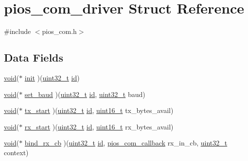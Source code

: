 \hypertarget{structpios__com__driver}{\section{pios\-\_\-com\-\_\-driver Struct Reference}
\label{structpios__com__driver}
}


{\ttfamily \#include $<$pios\-\_\-com.\-h$>$}

\subsection*{Data Fields}
\begin{DoxyCompactItemize}
\item 
\hyperlink{group___n_a_m_e_ga18028b8badbf1ea7e704ccac3c488e82}{void}($\ast$ \hyperlink{structpios__com__driver_a985b9b538b715cba9b4e6996092a5784}{init} )(\hyperlink{stdint_8h_a435d1572bf3f880d55459d9805097f62}{uint32\-\_\-t} \hyperlink{group___u_a_v_gabaabdc509cdaba7df9f56c6c76f3ae19}{id})
\item 
\hyperlink{group___n_a_m_e_ga18028b8badbf1ea7e704ccac3c488e82}{void}($\ast$ \hyperlink{structpios__com__driver_a71fc7a3baa59051532f8ea0184eb62c9}{set\-\_\-baud} )(\hyperlink{stdint_8h_a435d1572bf3f880d55459d9805097f62}{uint32\-\_\-t} \hyperlink{group___u_a_v_gabaabdc509cdaba7df9f56c6c76f3ae19}{id}, \hyperlink{stdint_8h_a435d1572bf3f880d55459d9805097f62}{uint32\-\_\-t} baud)
\item 
\hyperlink{group___n_a_m_e_ga18028b8badbf1ea7e704ccac3c488e82}{void}($\ast$ \hyperlink{structpios__com__driver_a54751423be66aa5eeef4655f56ae656d}{tx\-\_\-start} )(\hyperlink{stdint_8h_a435d1572bf3f880d55459d9805097f62}{uint32\-\_\-t} \hyperlink{group___u_a_v_gabaabdc509cdaba7df9f56c6c76f3ae19}{id}, \hyperlink{stdint_8h_a273cf69d639a59973b6019625df33e30}{uint16\-\_\-t} tx\-\_\-bytes\-\_\-avail)
\item 
\hyperlink{group___n_a_m_e_ga18028b8badbf1ea7e704ccac3c488e82}{void}($\ast$ \hyperlink{structpios__com__driver_a0c6384ecc39e1e638dddb2570602f7ff}{rx\-\_\-start} )(\hyperlink{stdint_8h_a435d1572bf3f880d55459d9805097f62}{uint32\-\_\-t} \hyperlink{group___u_a_v_gabaabdc509cdaba7df9f56c6c76f3ae19}{id}, \hyperlink{stdint_8h_a273cf69d639a59973b6019625df33e30}{uint16\-\_\-t} rx\-\_\-bytes\-\_\-avail)
\item 
\hyperlink{group___n_a_m_e_ga18028b8badbf1ea7e704ccac3c488e82}{void}($\ast$ \hyperlink{structpios__com__driver_aed9041fdd757cf95e57c9d523e30fd57}{bind\-\_\-rx\-\_\-cb} )(\hyperlink{stdint_8h_a435d1572bf3f880d55459d9805097f62}{uint32\-\_\-t} \hyperlink{group___u_a_v_gabaabdc509cdaba7df9f56c6c76f3ae19}{id}, \hyperlink{group___p_i_o_s___c_o_m_ga23f1888821f1f74a50c02adc459df597}{pios\-\_\-com\-\_\-callback} rx\-\_\-in\-\_\-cb, \hyperlink{stdint_8h_a435d1572bf3f880d55459d9805097f62}{uint32\-\_\-t} context)

\end{DoxyCompactItemize}
